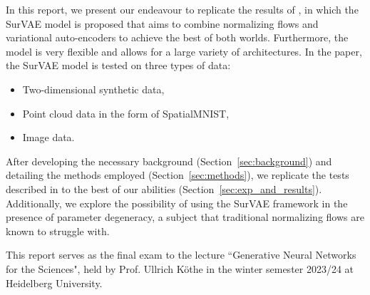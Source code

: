 
In this report, we present our endeavour to replicate the results of \cite{nielsen2020survae}, in which the SurVAE model is proposed that aims to combine normalizing flows and variational auto-encoders to achieve the best of both worlds. Furthermore, the model is very flexible and allows for a large variety of architectures. In the paper, the SurVAE model is tested on three types of data:

\begin{itemize}
\item Two-dimensional synthetic data,
\item Point cloud data in the form of SpatialMNIST,
\item Image data.
\end{itemize}

After developing the necessary background (Section~\ref{sec:background}) and detailing the methods employed (Section~\ref{sec:methods}), we replicate the tests described in \cite{nielsen2020survae} to the best of our abilities (Section~\ref{sec:exp_and_results}). Additionally, we explore the possibility of using the SurVAE framework in the presence of parameter degeneracy, a subject that traditional normalizing flows are known to struggle with.

This report serves as the final exam to the lecture ``Generative Neural Networks for the Sciences", held by Prof. Ullrich Köthe in the winter semester 2023/24 at Heidelberg University.